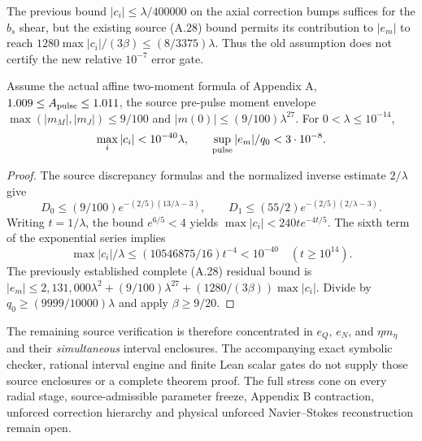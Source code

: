 The previous bound $|c_i|\le\lambda/400000$ on the
axial correction bumps suffices for the $b_s$ shear,
but the existing source (A.28) bound permits its
contribution to $|e_m|$ to reach
$1280\max|c_i|/(3\beta)\le(8/3375)\lambda$.
Thus the old assumption does not certify the new
relative $10^{-7}$ error gate.

\begin{lemma}
\label{lem:A29A30-actual-bump}
Assume the actual affine two-moment formula of
Appendix A, $1.009\le A_{\rm pulse}\le1.011$,
the source pre-pulse moment envelope $\max(|m_M|,|m_J|)
\le9/100$ and $|m(0)|\le(9/100)\lambda^{27}$.
For $0<\lambda\le10^{-14}$,
\[
 \max_i|c_i|<10^{-40}\lambda,\qquad
 \sup_{\rm pulse}|e_m|/q_0<3\cdot10^{-8}.
\]
\end{lemma}
\begin{proof}
The source discrepancy formulas and the normalized inverse
estimate $2/\lambda$ give
\[
D_0\le(9/100)e^{-(2/5)(13/\lambda-3)},\qquad
D_1\le(55/2)e^{-(2/5)(2/\lambda-3)}.
\]
Writing $t=1/\lambda$, the bound $e^{6/5}<4$ yields
$\max|c_i|<240t e^{-4t/5}$.
The sixth term of the exponential series implies
\[
 \max|c_i|/\lambda
 \le(10546875/16)t^{-4}<10^{-40}
 \quad(t\ge10^{14}).
\]
The previously established complete (A.28) residual bound is
$|e_m|\le2{,}131{,}000\lambda^2+
(9/100)\lambda^{27}+(1280/(3\beta))\max|c_i|$.
Divide by $q_0\ge(9999/10000)\lambda$ and apply
$\beta\ge9/20$.
\end{proof}

The remaining source verification is therefore concentrated in
$e_Q$, $e_N$, and $\eta m_\eta$ and their \emph{simultaneous}
interval enclosures. The accompanying exact symbolic checker,
rational interval engine and finite Lean scalar gates do not
supply those source enclosures or a complete theorem proof.
The full stress cone on every radial stage, source-admissible
parameter freeze, Appendix B contraction, unforced correction
hierarchy and physical unforced Navier--Stokes reconstruction
remain open.
